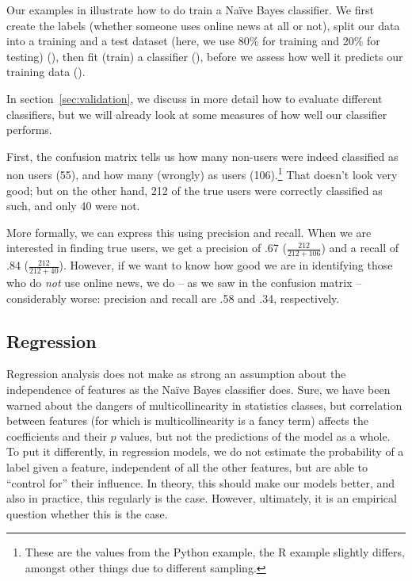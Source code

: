 Our examples in  illustrate how to do train a Na\"ive Bayes classifier.
We first create the labels (whether someone uses online news at all or
not), split our data into a training and a test dataset (here, we use
80\% for training and 20\% for testing) (), then
fit (train) a classifier (), before we assess how well it
predicts our training data ().

In section~\ref{sec:validation}, we discuss in more detail how to
evaluate different classifiers, but we will already look at some
measures of how well our classifier performs.

First, the confusion matrix tells us how many non-users were indeed
classified as non users (55), and how many (wrongly) as users
(106).\footnote{These are the values from the Python example, the R
  example slightly differs, amongst other things due to different
  sampling.} That doesn't look very good; but on the other hand, 212
of the true users were correctly classified as such, and only 40 were
not.

More formally, we can express this using precision and recall. When we
are interested in finding true users, we get a precision of .67
($\frac{212}{212+106}$) and a recall of .84 ($\frac{212}{212+40}$).
However, if we want to know how good we are in identifying those who
do \emph{not} use online news, we do -- as we saw in the confusion
matrix -- considerably worse: precision and recall are .58 and .34,
respectively.



\subsection{Regression}
Regression analysis does not make as strong an assumption about the
independence of features as the Na\"ive Bayes classifier does.  Sure,
we have been warned about the dangers of multicollinearity in
statistics classes, but correlation between features (for which is
multicollinearity is a fancy term) affects the coefficients and their
$p$ values, but not the predictions of the model as a whole.  To put
it differently, in regression models, we do not estimate the
probability of a label given a feature, independent of all the other
features, but are able to ``control for'' their influence.  In theory,
this should make our models better, and also in practice, this
regularly is the case. However, ultimately, it is an empirical
question whether this is the case.

